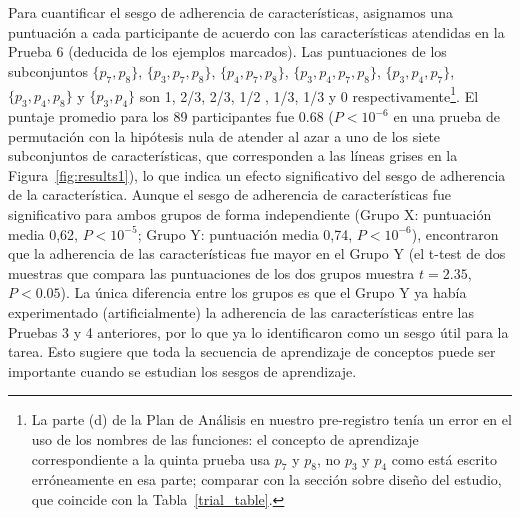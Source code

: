 Para cuantificar el sesgo de adherencia de características, asignamos una puntuación a cada participante de acuerdo con las características atendidas en la Prueba 6 (deducida de los ejemplos marcados). Las puntuaciones de los subconjuntos $ \{p_7, p_8 \} $, $ \{p_3, p_7, p_8 \} $, $ \{p_4, p_7, p_8 \} $, $ \{p_3, p_4, p_7, p_8 \} $, $ \{p_3, p_4, p_7 \} $, $ \{p_3, p_4, p_8 \} $ y $ \{p_3, p_4 \} $ son 1, 2/3, 2/3, 1/2 , 1/3, 1/3 y 0 respectivamente\footnote{La parte (d) de la Plan de Análisis en nuestro pre-registro tenía un error en el uso de los nombres de las funciones: el concepto de aprendizaje correspondiente a la quinta prueba usa $ p_7 $ y $ p_8 $, no $ p_3 $ y $ p_4 $ como está escrito erróneamente en esa parte; comparar con la sección sobre diseño del estudio, que coincide con la Tabla~\ref{trial_table}.}. El puntaje promedio para los 89 participantes fue 0.68 ($ P <10^{- 6} $ en una prueba de permutación con la hipótesis nula de atender al azar a uno de los siete subconjuntos de características, que corresponden a las líneas grises en la Figura~\ref{fig:results1}), lo que indica un efecto significativo del sesgo de adherencia de la característica. Aunque el sesgo de adherencia de características fue significativo para ambos grupos de forma independiente (Grupo X: puntuación media 0,62, $ P <10^{-5} $; Grupo Y: puntuación media 0,74, $ P <10^{-6} $), encontraron que la adherencia de las características fue mayor en el Grupo Y (el t-test de dos muestras que compara las puntuaciones de los dos grupos muestra $ t = 2.35 $, $ P <0.05 $). La única diferencia entre los grupos es que el Grupo Y ya había experimentado (artificialmente) la adherencia de las características entre las Pruebas 3 y 4 anteriores, por lo que ya lo identificaron como un sesgo útil para la tarea. Esto sugiere que toda la secuencia de aprendizaje de conceptos puede ser importante cuando se estudian los sesgos de aprendizaje.


